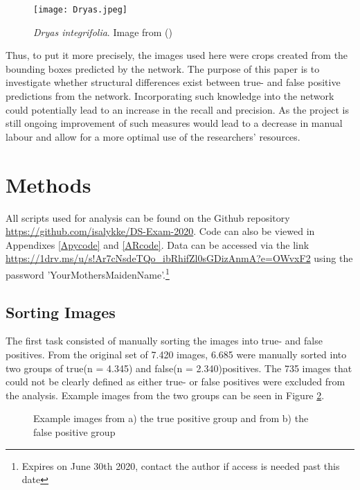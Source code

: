 \documentclass[12pt]{article}
\begin{document}
\begin{figure}[h]
	\begin{center}
		\texttt{[image: Dryas.jpeg]}
	\end{center}
	\caption{\textit{Dryas integrifolia}. Image from (\cite{DryasIntegrifolia2020})}
	\label{fig:dryas}
\end{figure}

Thus, to put it more precisely, the images used here were crops created from the bounding boxes predicted by the network. The purpose of this paper is to investigate whether structural differences exist between true- and false positive predictions from the network. Incorporating such knowledge into the network could potentially lead to an increase in the recall and precision. As the project is still ongoing improvement of such measures would lead to a decrease in manual labour and allow for a more optimal use of the researchers' resources.

\section{Methods}
All scripts used for analysis can be found on the Github repository \url{https://github.com/isalykke/DS-Exam-2020}. Code can also be viewed in Appendixes \ref{Apycode} and \ref{ARcode}. Data can be accessed via the link \url{https://1drv.ms/u/s!Ar7cNsdeTQo_ibRhifZl0sGDizAnmA?e=OWvxF2} using the password 'YourMothersMaidenName'.\footnote{Expires on June 30th 2020, contact the author if access is needed past this date}

\subsection{Sorting Images}
The first task consisted of manually sorting the images into true- and false positives. 
From the original set of 7.420 images, 6.685 were manually sorted into two groups of true(n = 4.345) and false(n = 2.340)positives. The 735 images that could not be clearly defined as either true- or false positives were excluded from the analysis. Example images from the two groups can be seen in Figure \ref{fig:groupex}.


\begin{figure}[ht]
	\begin{center}
		\hfill
		\caption{Example images from a) the true positive group and from b) the false positive group} 
		\label{fig:groupex}
	\end{center}
\end{figure}
\end{document}
